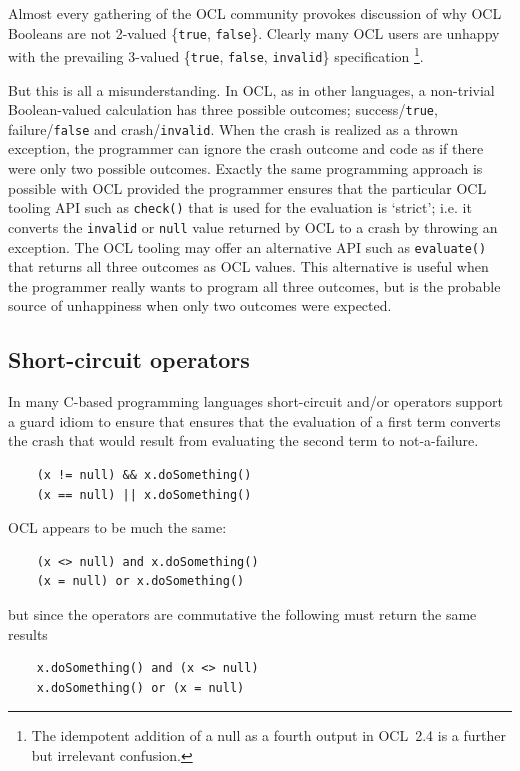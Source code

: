 \documentclass{jot}
\begin{document}
Almost every gathering of the OCL community provokes discussion of why OCL Booleans are not 2-valued \{\verb$true$, \verb$false$\}. Clearly many OCL users are unhappy with the prevailing 3-valued \{\verb$true$, \verb$false$, \verb$invalid$\} specification \footnote{The idempotent addition of a null as a fourth output in OCL~2.4 is a further but irrelevant confusion.}.

But this is all a misunderstanding. In OCL, as in other languages, a non-trivial Boolean-valued calculation has three possible outcomes; success/\verb$true$, failure/\verb$false$ and crash/\verb$invalid$. When the crash is realized as a thrown exception, the programmer can ignore the crash outcome and code as if there were only two possible outcomes. Exactly the same programming approach is possible with OCL provided the programmer ensures that the particular OCL tooling API such as \verb$check()$ that is used for the evaluation is `strict'; i.e. it converts the \verb$invalid$ or \verb$null$ value returned by OCL to a crash by throwing an exception. The OCL tooling may offer an alternative API such as \verb$evaluate()$ that returns all three outcomes as OCL values. This alternative is useful when the programmer really wants to program all three outcomes, but is the probable source of unhappiness when only two outcomes were expected.

\subsection{Short-circuit operators}

In many C-based programming languages short-circuit and/or operators support a guard idiom to ensure that ensures that the evaluation of a first term converts the crash that would result from evaluating the second term to not-a-failure.

\begin{verbatim}
    (x != null) && x.doSomething()
    (x == null) || x.doSomething()
\end{verbatim}

OCL appears to be much the same:

\begin{verbatim}
    (x <> null) and x.doSomething()
    (x = null) or x.doSomething()
\end{verbatim}

but since the operators are commutative the following must return the same results 

\begin{verbatim}
    x.doSomething() and (x <> null) 
    x.doSomething() or (x = null) 
\end{verbatim}
\end{document}
